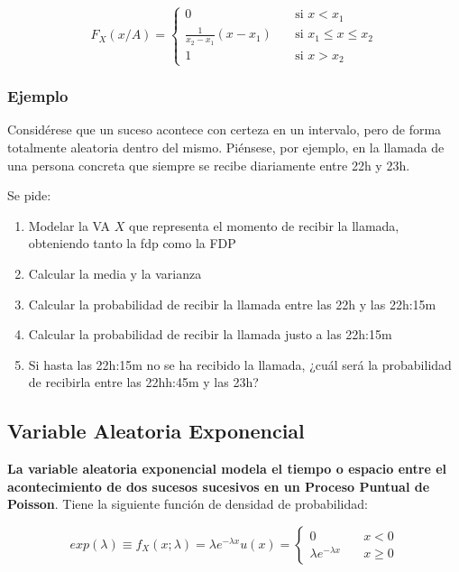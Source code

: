 \documentclass[11pt]{article}
\providecommand{\tightlist}{%
      \setlength{\itemsep}{0pt}\setlength{\parskip}{0pt}}
\begin{document}
\[
F_X(x/A) =
\begin{cases}
    0                   & \quad \text{si } x < x_1 \\
    \frac{1}{x_2-x_1} (x-x_1) & \quad \text{si } x_1\leq x \leq x_2\\
    1                   & \quad \text{si } x > x_2
\end{cases}
\]

    \hypertarget{ejemplo}{%
\subsubsection*{Ejemplo}\label{ejemplo}}

Considérese que un suceso acontece con certeza en un intervalo, pero de
forma totalmente aleatoria dentro del mismo. Piénsese, por ejemplo, en
la llamada de una persona concreta que siempre se recibe diariamente
entre 22h y 23h.

Se pide:

\begin{enumerate}
\def\labelenumi{\arabic{enumi}.}
\tightlist
\item
  Modelar la VA \(X\) que representa el momento de recibir la llamada,
  obteniendo tanto la fdp como la FDP
\item
  Calcular la media y la varianza
\item
  Calcular la probabilidad de recibir la llamada entre las 22h y las
  22h:15m
\item
  Calcular la probabilidad de recibir la llamada justo a las 22h:15m
\item
  Si hasta las 22h:15m no se ha recibido la llamada, ¿cuál será la
  probabilidad de recibirla entre las 22hh:45m y las 23h?
\end{enumerate}

    \hypertarget{variable-aleatoria-exponencial}{%
\subsection*{Variable Aleatoria
Exponencial}\label{variable-aleatoria-exponencial}}

\textbf{La variable aleatoria exponencial modela el tiempo o espacio
entre el acontecimiento de dos sucesos sucesivos en un Proceso Puntual
de Poisson}. Tiene la siguiente función de densidad de probabilidad:

\[
exp(\lambda) \equiv f_X(x;\lambda) = \lambda e^{-\lambda x} u(x) =
\begin{cases}
    0             & \quad x<0\\
    \lambda e^{-\lambda x} & \quad x \geq 0
\end{cases} 
\]
\end{document}
